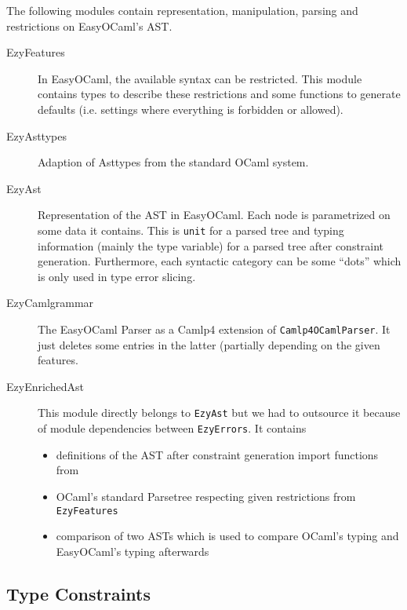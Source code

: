 The following modules contain representation, manipulation, parsing and 
restrictions on EasyOCaml's AST.

\begin{description}
    \item[EzyFeatures] In EasyOCaml, the available syntax can be 
        restricted.  This module contains types to describe these 
        restrictions and some functions to generate defaults (i.e. 
        settings where everything is forbidden or allowed).
    \item[EzyAsttypes] Adaption of Asttypes from the standard OCaml 
        system.
    \item[EzyAst] Representation of the AST in EasyOCaml.  Each node 
        is parametrized on some data it contains.  This is \texttt{unit} 
        for a parsed tree and typing information (mainly the type 
        variable) for a parsed tree after constraint generation. 
        Furthermore, each syntactic category can be some ``dots'' which 
        is only used in type error slicing.
    \item[EzyCamlgrammar] The EasyOCaml Parser as a Camlp4 extension 
        of \texttt{Camlp4OCamlParser}.  It just deletes some entries in 
        the latter (partially depending on the given features.
    \item[EzyEnrichedAst] This module directly belongs to 
        \texttt{EzyAst} but we had to outsource it because of module 
        dependencies between \texttt{EzyErrors}.  It contains
        \begin{itemize}
            \item definitions of the AST after constraint generation 
                import functions from
            \item OCaml's standard Parsetree respecting given 
                restrictions from \texttt{EzyFeatures}
            \item comparison of two ASTs which is used to compare 
                OCaml's typing and EasyOCaml's typing afterwards
        \end{itemize}
\end{description}


\subsection{Type Constraints}


